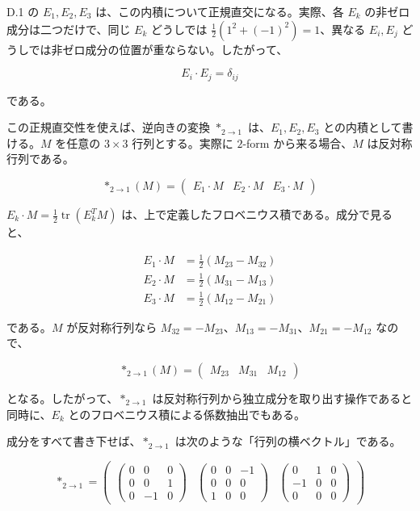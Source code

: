 \documentclass[a4paper,12pt,openany]{book}
\begin{document}
D.1 の \(E_1,E_2,E_3\) は、この内積について正規直交になる。実際、各
\(E_k\) の非ゼロ成分は二つだけで、同じ \(E_k\) どうしでは
\(\frac{1}{2}(1^2+(-1)^2)=1\)、異なる \(E_i,E_j\)
どうしでは非ゼロ成分の位置が重ならない。したがって、

\[
E_i\cdot E_j=\delta_{ij}
\]

である。

この正規直交性を使えば、逆向きの変換 \(\ast_{2\to1}\)
は、\(E_1,E_2,E_3\) との内積として書ける。\(M\) を任意の \(3\times3\)
行列とする。実際に \(2\)-form から来る場合、\(M\) は反対称行列である。

\[
\ast_{2\to1}(M)
=
\begin{pmatrix}
E_1\cdot M & E_2\cdot M & E_3\cdot M
\end{pmatrix}
\]

\(E_k\cdot M=\frac{1}{2}\operatorname{tr}(E_k^T M)\)
は、上で定義したフロベニウス積である。成分で見ると、

\[
\begin{aligned}
E_1 \cdot M &= \frac{1}{2}(M_{23}-M_{32}) \\
E_2 \cdot M &= \frac{1}{2}(M_{31}-M_{13}) \\
E_3 \cdot M &= \frac{1}{2}(M_{12}-M_{21})
\end{aligned}
\]

である。\(M\) が反対称行列なら
\(M_{32}=-M_{23}\)、\(M_{13}=-M_{31}\)、\(M_{21}=-M_{12}\) なので、

\[
\ast_{2\to1}(M)
=
\begin{pmatrix}
M_{23} & M_{31} & M_{12}
\end{pmatrix}
\]

となる。したがって、\(\ast_{2\to1}\)
は反対称行列から独立成分を取り出す操作であると同時に、\(E_k\)
とのフロベニウス積による係数抽出でもある。

成分をすべて書き下せば、\(\ast_{2\to1}\)
は次のような「行列の横ベクトル」である。

\[
\ast_{2\to1} = \begin{pmatrix}
\begin{pmatrix} 0 & 0 & 0 \\ 0 & 0 & 1 \\ 0 & -1 & 0 \end{pmatrix} &
\begin{pmatrix} 0 & 0 & -1 \\ 0 & 0 & 0 \\ 1 & 0 & 0 \end{pmatrix} &
\begin{pmatrix} 0 & 1 & 0 \\ -1 & 0 & 0 \\ 0 & 0 & 0 \end{pmatrix}
\end{pmatrix}
\]
\end{document}
